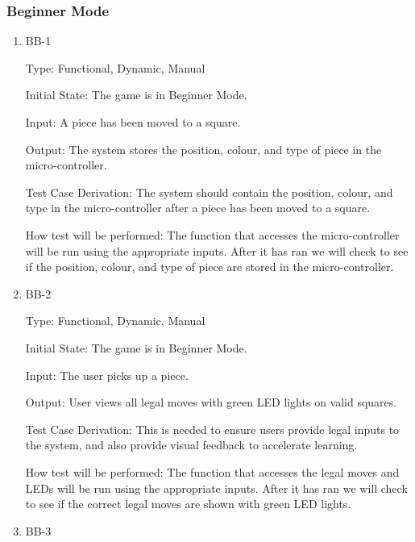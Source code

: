 \documentclass[12pt, titlepage]{article}
\begin{document}
    \subsubsection{Beginner Mode}
  
    \begin{enumerate}
  
      \item{BB-1\\}
  
      Type: Functional, Dynamic, Manual
                          
      Initial State: The game is in Beginner Mode.
                          
      Input: A piece has been moved to a square.
                          
      Output: The system stores the position, colour, and type of piece in the micro-controller.
                          
      Test Case Derivation: The system should contain the position, colour, and type in the micro-controller
      after a piece has been moved to a square.
  
      How test will be performed: The function that accesses the micro-controller will be run using the appropriate inputs.
      After it has ran we will check to see if the position, colour, and type of piece are stored in the micro-controller.  
  
      \item{BB-2\\}
  
      Type: Functional, Dynamic, Manual
                          
      Initial State: The game is in Beginner Mode.
                          
      Input: The user picks up a piece.
                          
      Output: User views all legal moves with green LED lights on valid squares.
                          
      Test Case Derivation: This is needed to ensure users provide legal inputs to the system,
      and also provide visual feedback to accelerate learning.
  
      How test will be performed: The function that accesses the legal moves and LEDs will be run using the appropriate inputs.
      After it has ran we will check to see if the correct legal moves are shown with green LED lights.  
  
      \item{BB-3\\}
  

\end{enumerate}
\end{document}
